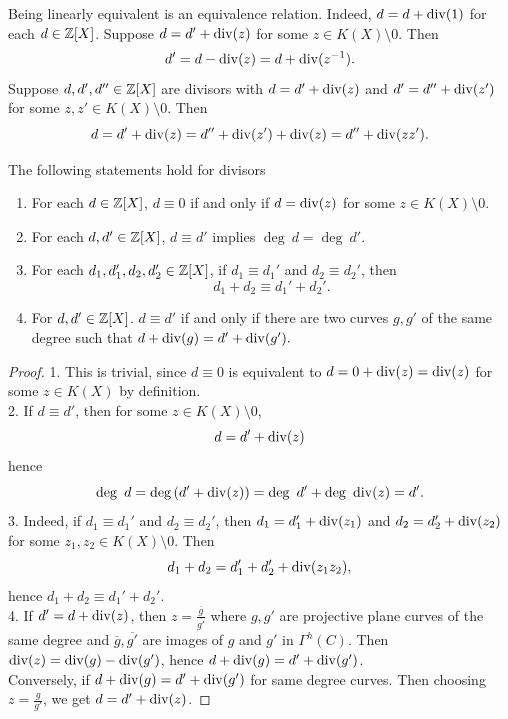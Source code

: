     \begin{remark}
        Being linearly equivalent is an equivalence relation. Indeed, $d= d+ \mathrm{div}(1)$ for each $d\in \mathbb{Z}[X]$. Suppose $d = d'+ \mathrm{div}(z)$ for some $z\in K(X)\setminus 0$. Then 
        $$
            d' = d-\mathrm{div}(z) = d+ \mathrm{div}(z^{-1}).
        $$
        Suppose $d,d',d''\in \mathbb{Z}[X]$ are divisors with $d=d'+\mathrm{div}(z)$ and $d' = d''+\mathrm{div}(z')$ for some $z,z'\in K(X)\setminus 0$. Then 
        $$
            d = d' + \mathrm{div}(z) = d'' + \mathrm{div}(z')+\mathrm{div}(z) = d'' + \mathrm{div}(zz').
        $$
    \end{remark}
    \begin{lemma}
        The following statements hold for divisors
        \begin{enumerate}
            \item For each $d\in \mathbb{Z}[X]$,  $d\equiv 0$ if and only if $d=\mathrm{div}(z)$ for some $z\in K(X)\setminus 0$.
            \item For each $d,d'\in \mathbb{Z}[X]$, $d\equiv d'$ implies $\deg\ d = \deg \ d'$.
            \item For each $d_1,d_1',d_2,d_2'\in \mathbb{Z}[X]$, if $d_1 \equiv d_1'$ and $d_2\equiv d_2'$, then 
            $$
                d_1 + d_2 \equiv d_1' + d_2'.
            $$
            \item For $d,d'\in \mathbb{Z}[X]$. $d\equiv d'$ if and only if there are two curves $g,g'$ of the same degree such that $d+\mathrm{div}(g) = d' +\mathrm{div}(g').$
        \end{enumerate}
    \end{lemma}
    \begin{proof}
        1. This is trivial, since $d\equiv 0$ is equivalent to $d = 0 + \mathrm{div}(z) = \mathrm{div}(z)$ for some $z\in K(X)$ by definition.\\
        2. If $d\equiv d'$, then for some $z\in K(X)\setminus 0$,  
        $$
            d=d'+\mathrm{div}(z)
        $$
        hence 
        $$
            \deg \ d = \deg \left( d'+\Div(z)\right)= \deg \ d' + \deg \ \Div(z) = d'.
        $$
        3. Indeed, if $d_1 \equiv d_1'$ and $d_2\equiv d_2'$, then $d_1 = d_1'+\mathrm{div}(z_1)$ and $d_2 = d_2'+\mathrm{div}(z_2)$ for some $z_1,z_2\in K(X)\setminus 0$. Then 
        $$
            d_1+d_2 = d_1'+d_2'+\mathrm{div}(z_1z_2),
        $$
        hence $d_1+d_2\equiv d_1'+d_2'$.\\
        4. If $d' = d+ \mathrm{div}(z)$, then $z = \frac{\overline{g}}{\overline{g'}}$ where $g,g'$ are projective plane curves of the same degree and $\overline{g},\overline{g'}$ are images of $g$ and $g'$ in $\Gamma^h(C)$. Then $\mathrm{div}(z) = \mathrm{div}(g)-\mathrm{div}(g')$, hence $d + \mathrm{div}(g) = d' +\mathrm{div}(g')$.\\
        Conversely, if $d + \mathrm{div}(g) = d' + \mathrm{div}(g')$ for same degree curves. Then choosing $z = \frac{g}{g'}$, we get $d = d' + \mathrm{div}(z)$. 
    \end{proof}

